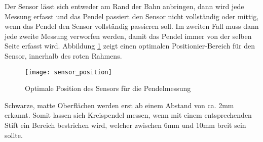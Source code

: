 Der Sensor lässt sich entweder am Rand der Bahn anbringen, dann wird jede Messung erfasst und das Pendel passiert den Sensor nicht vollständig oder mittig, wenn das Pendel den Sensor vollständig passieren soll. Im zweiten Fall muss dann jede zweite Messung verworfen werden, damit das Pendel immer von der selben Seite erfasst wird. Abbildung \ref{fig:sensor_position} zeigt einen optimalen Positionier-Bereich für den Sensor, innerhalb des roten Rahmens.
	\begin{figure}[H]
		\centering
		\texttt{[image: sensor\_position]}
		\caption{Optimale Position des Sensors für die Pendelmessung}
		\label{fig:sensor_position}
	\end{figure}
	\noindent Schwarze, matte Oberflächen werden erst ab einem Abstand von ca. 2mm erkannt. Somit lassen sich Kreispendel messen, wenn mit einem entsprechenden Stift ein Bereich bestrichen wird, welcher zwischen 6mm und 10mm breit sein sollte.